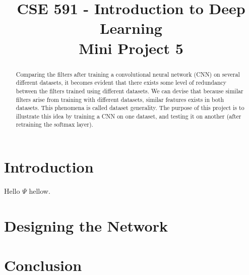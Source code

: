 \documentclass[conference,compsoc]{IEEEtran}
\begin{document}
%
\title{CSE 591 - Introduction to Deep Learning\\Mini Project 5}


\author{
}

\maketitle

\begin{abstract}
Comparing the filters after training a convolutional neural network (CNN) on several different datasets, it becomes evident that there exists some level of redundancy between the filters trained using different datasets. We can devise that because similar filters arise from training with different datasets, similar features exists in both datasets. This phenomena is called dataset generality. The purpose of this project is to illustrate this idea by training a CNN on one dataset, and testing it on another (after retraining the softmax layer). 
\end{abstract}



\IEEEpeerreviewmaketitle



\section{Introduction}
Hello $\Psi$ hellow.

 


\section{Designing the Network}




\section{Conclusion}
%




\end{document}
